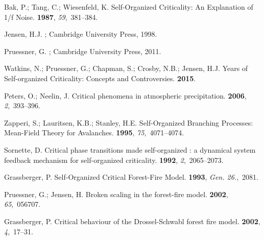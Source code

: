 \documentclass[aps,prl,showpacs,superscriptaddress,groupedaddress,notitlepage]{revtex4-1}
\begin{document}
\begin{thebibliography}{-------}
\providecommand{\natexlab}[1]{#1}

Bak, P.; Tang, C.; Wiesenfeld, K.
\newblock Self-Organized Criticality: An Explanation of 1/f Noise.
 {\bf 1987}, {\em 59},~381--384.

Jensen, H.J.
; Cambridge University Press,  1998.

Pruessner, G.
; Cambridge University Press,  2011.

Watkins, N.; Pruessner, G.; Chapman, S.; Crosby, N.B.; Jensen, H.J.
 Years of Self-organized Criticality: Concepts and Controversies.
 {\bf 2015}.

Peters, O.; Neelin, J.
\newblock Critical phenomena in atmospheric precipitation.
 {\bf 2006}, {\em 2},~393--396.

Zapperi, S.; Lauritsen, K.B.; Stanley, H.E.
\newblock Self-Organized Branching Processes: Mean-Field Theory for Avalanches.
 {\bf 1995}, {\em 75},~4071--4074.

Sornette, D.
\newblock Critical phase transitions made self-organized : a dynamical system
  feedback mechanism for self-organized criticality.
 {\bf 1992}, {\em 2},~2065--2073.

Grassberger, P.
\newblock Self-Organized Critical Forest-Fire Model.
 {\bf 1993}, {\em Gen. 26.},~2081.

Pruessner, G.; Jensen, H.
\newblock Broken scaling in the forest-fire model.
 {\bf 2002}, {\em 65},~056707.

Grassberger, P.
\newblock Critical behaviour of the Drossel-Schwabl forest fire model.
 {\bf 2002}, {\em 4},~17--31.


\end{thebibliography}
\end{document}

